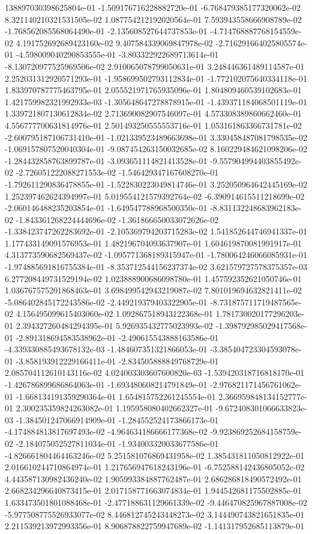 138897030398625804e-01	-1.509176716228882720e-01	-6.768479385177320062e-02	8.321140210321531505e-02	1.087754212192020564e-01	7.593943558666908789e-02	-1.768562085568064490e-01	-2.135608527644737853e-01	-4.714768887768154559e-02	4.191752692689423160e-02	9.407584339069847978e-02	-2.716291664025805574e-01	-4.598009040290853555e-01	-3.803322922689713614e-01	-8.130720977525969506e-02	2.910065078799050631e-01	3.248446361489114587e-01	2.252031312920571293e-01	-1.958699502793112834e-01	-1.772102075640334118e-01	1.833970787775463795e-01	2.055521971765935096e-01	1.804809460539102683e-01	1.421759982321992933e-03	-1.305648647278878915e-01	-1.439371184068501119e-01	1.339721807130612834e-02	2.713690082907546097e-01	4.573308389860662460e-01	4.556777700631814976e-01	2.501493250555553716e-01	1.053161863366731781e-02	-2.600795187106731410e-01	-1.021339523489663698e-01	3.330458487081798535e-02	-1.069157807520040304e-01	-9.087454263150032685e-02	8.160229484621098206e-02	-1.284432858763899787e-01	-3.093651114821413528e-01	-9.557904994403855492e-02	-2.726051222088271553e-02	-1.546429347167608270e-01	-1.792611290836478855e-01	-1.522830223049814746e-01	3.252050964642445169e-02	1.252397462624394997e-01	5.019554121579392764e-02	-6.390914615511218699e-02	-2.060146488235203854e-01	-1.649547788968500350e-01	-8.831132248683962183e-02	-1.843361268224444696e-02	-1.361866650033072626e-02	-1.338423747262283692e-01	-2.105369794203715283e-02	1.541852644746941337e-01	1.177433149091576953e-01	1.482196704093637907e-01	1.604619870081991917e-01	4.313773590682569437e-02	-1.095771368189315947e-01	-1.780064246066085931e-01	-1.974885691816755384e-01	-8.353712544156237374e-02	3.621579727578375357e-03	6.277208449731529194e-02	1.023888900686098780e-01	1.457592352621050746e-01	1.036767575201868463e-01	3.698499542943219087e-02	7.801019694632821411e-02	-5.086402845172243586e-02	-2.449219379403322905e-01	-8.731875711719487565e-02	4.156495099615403060e-02	1.092867518943122368e-01	1.781730020177296203e-01	2.394327260484294395e-01	5.926935432775023993e-02	-1.398792985029417568e-01	-2.891318694583538962e-01	-2.490615543888163586e-01	-4.339330885493678132e-03	-1.484607351321866053e-01	-3.385404723304593078e-01	-3.858193912229166411e-01	-2.834505888849768729e-01	2.085704112610143116e-02	4.024003303607600820e-03	-1.539420318716818170e-01	-1.426786899686864063e-01	-1.693480608214791849e-01	-2.976821171456761062e-01	-1.668134191359290364e-01	1.654815752261245554e-01	2.366959848134152777e-01	2.300235359824263082e-01	1.195958080402662327e-01	-9.672408301066633823e-03	-1.384501247066914909e-01	-1.284552524173866173e-01	-4.174884813817697493e-02	-4.964634186666177368e-02	-9.923869252684158759e-02	-2.184075052527811034e-01	-1.934003320033677586e-01	-4.826661804464463246e-02	5.251581076869431958e-02	1.385431811050812922e-01	2.016610244710864974e-01	1.217656947618243196e-01	-6.752588142436805052e-02	4.443587130982436240e-02	1.905993384887762487e-01	2.686286818490572492e-01	2.668234296640873415e-01	2.017158771663074834e-01	1.944542681175502885e-01	1.633473501801088468e-01	-2.477188631129661339e-02	-9.446470825967887008e-02	-5.977508775526933077e-02	8.446812745243448273e-02	3.144490743821651835e-01	2.211539213972993356e-01	8.906878822759947689e-02	-1.141317952685113879e-01
